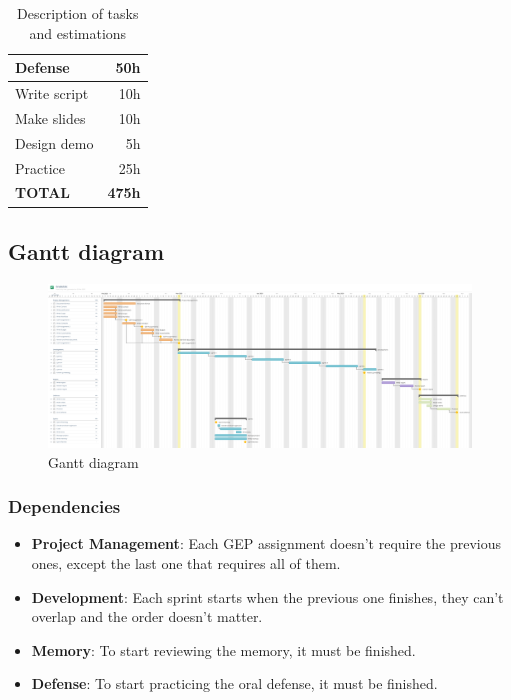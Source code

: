 \begin{table}
\begin{singlespace}
\begin{tabular}{lr}
    \midrule
    \textbf{Defense} & \textbf{50h} \\
    \midrule
    \hspace{3mm}Write script & 10h \\
    \hspace{3mm}Make slides & 10h \\
    \hspace{3mm}Design demo & 5h \\
    \hspace{3mm}Practice & 25h \\
    \midrule
    \textbf{TOTAL} & \textbf{475h} \\
    \bottomrule
    \end{tabular}
    \end{singlespace}
    
    \caption{Description of tasks and estimations}
    \label{task-list}
\end{table}

\newpage
\subsection{Gantt diagram}

\begin{figure}[ht!]
\begin{center}
\includegraphics[width=\textheight-79pt,angle=90]{media/diagrams/gantt.pdf}
\end{center}
\caption[Gantt diagram]{Gantt diagram}
\label{gantt}
\end{figure}

\subsubsection{Dependencies}

\begin{itemize}
    \item \textbf{Project Management}: Each GEP assignment doesn't require the previous ones, except the last one that requires all of them.
    \item \textbf{Development}: Each sprint starts when the previous one finishes, they can't overlap and the order doesn't matter.
    \item \textbf{Memory}: To start reviewing the memory, it must be finished.
    \item \textbf{Defense}: To start practicing the oral defense, it must be finished.
\end{itemize}

